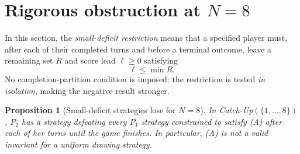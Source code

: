 \documentclass[11pt,a4paper]{article}
\newtheorem{proposition}[theorem]{Proposition}
\theoremstyle{definition}
\theoremstyle{remark}
\begin{document}
\section{Rigorous obstruction at $N=8$}

In this section, the \emph{small-deficit restriction} means that a
specified player must, after each of their completed turns and
before a terminal outcome, leave a remaining set $R$ and score lead
$\ell\ge0$ satisfying
\begin{equation}\label{eq:A}
\tag{A}\boxed{\ell\le\min R.}
\end{equation}
No completion-partition condition is imposed: the restriction is
tested \emph{in isolation}, making the negative result stronger.

\begin{proposition}[Small-deficit strategies lose for $N=8$]
\label{prop:N8}
In Catch-Up$(\{1,\ldots,8\})$, $P_2$ has a strategy defeating
\emph{every} $P_1$ strategy constrained to satisfy (A) after each of
her turns until the game finishes.  In particular, (A) is not a
valid invariant for a uniform drawing strategy.
\end{proposition}
\end{document}
